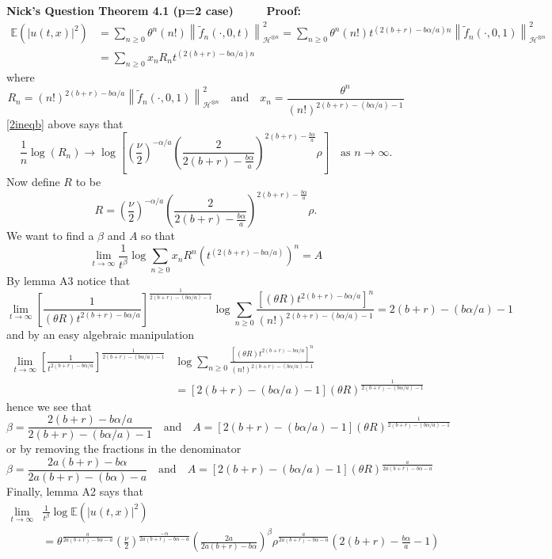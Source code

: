 \documentclass[a4paper,11pt]{article}
\numberwithin{equation}{section}
\theoremstyle{plain}
\theoremstyle{definition}
\newcommand{\Norm}[1]{\left\|  #1   \right\|}
\newcounter{NQ}
\newenvironment{NickQuestion}[1][] %
{\refstepcounter{NQ}
	\begin{mdframed}[backgroundcolor=lightgray]\textbf{Nick's Question \theNQ \: #1~~}~~~\noindent}%
	{\end{mdframed}}
\numberwithin{NQ}{section}
\numberwithin{LQ}{section}
\numberwithin{ZQ}{section}
\begin{document}
\begin{NickQuestion}[Theorem 4.1 (p=2 case)]
		\textbf{Proof:}
		\begin{align*}
		\mathbb{E}(|u(t,x)|^2)  &= \sum_{n\ge 0} \theta^n(n!)\Norm{\tilde{f}_n(\cdot,0,t)}_{\mathcal{H}^{\otimes n}}^2 = \sum_{n \ge 0}\theta^n(n!)t^{(2(b+r)-b\alpha/a)n}\Norm{\tilde{f}_n(\cdot,0,1)}_{\mathcal{H}^{\otimes n}}^2
		\\&= \sum_{n \ge 0}x_nR_nt^{(2(b+r)-b\alpha/a)n}
		\end{align*}
		where
		\[
		R_n = (n!)^{2(b+r)-b\alpha/a}\Norm{\tilde{f}_n(\cdot,0,1)}_{\mathcal{H}^{\otimes n}}^2 \quad \text{and} \quad x_n=\frac{\theta^n}{(n!)^{2(b+r)-(b\alpha/a)-1}}
		\]
		\ref{2ineqb} above says that
		\[
		\frac{1}{n}\log(R_n) \to  \log\left[\left( \frac{\nu}{2} \right)^{-\alpha/a}\left(\frac{2}{2(b+r)-\frac{b\alpha}{a}}\right)^{2(b+r)-\frac{b\alpha}{a}}  \rho \right]  \quad \text{as } n\to \infty.
		\]
		Now define $R$ to be
		\[
		R=\left( \frac{\nu}{2} \right)^{-\alpha/a}\left(\frac{2}{2(b+r)-\frac{b\alpha}{a}}\right)^{2(b+r)-\frac{b\alpha}{a}}  \rho.
		\]
		We want to find a $\beta$ and $A$ so that
		\[
		\lim_{t \to \infty}\frac{1}{t^\beta} \log \sum_{n \ge 0} x_nR^n\left(t^{(2(b+r)-b\alpha/a)}\right)^n = A
		\]
		By lemma A3 notice that
		\[
		\lim_{t\to \infty} \left[\frac{1}{(\theta R)t^{2(b+r)-b\alpha/a}}\right]^{\frac{1}{2(b+r)-(b\alpha/a)-1}} \log \sum_{n \ge 0} \frac{\left[ (\theta R) t^{2(b+r)-b\alpha/a}\right]^n}{(n!)^{2(b+r)-(b\alpha/a)-1}} = 2(b+r) - (b\alpha/a) -1
		\]
		and by an easy algebraic manipulation
		\begin{align*}
		\lim_{t\to \infty} \left[\frac{1}{t^{2(b+r)-b\alpha/a}}\right]^{\frac{1}{2(b+r)-(b\alpha/a)-1}} & \log \sum_{n \ge 0} \frac{\left[ (\theta R) t^{2(b+r)-b\alpha/a}\right]^n}{(n!)^{2(b+r)-(b\alpha/a)-1}}
		\\&= [2(b+r) - (b\alpha/a) -1](\theta R)^{\frac{1}{2(b+r)-(b\alpha/a)-1}}
		\end{align*}
		hence we see that
		\[
		\beta = \frac{2(b+r)-b\alpha/a}{2(b+r)-(b\alpha/a)-1} \quad \text{and} \quad A=[2(b+r) - (b\alpha/a) -1](\theta R)^{\frac{1}{2(b+r)-(b\alpha/a)-1}}
		\]
		or by removing the fractions in the denominator
		\[
		\beta = \frac{2a(b+r)-b\alpha}{2a(b+r)-(b\alpha)-a} \quad \text{and} \quad A=[2(b+r) - (b\alpha/a) -1](\theta R)^{\frac{a}{2a(b+r)-b\alpha-a}}
		\]
		Finally, lemma A2 says that
		\begin{align}
		\lim_{t\to \infty} & \frac{1}{t^\beta} \log \mathbb{E}(|u(t,x)|^2) \nonumber
		\\&= \theta^{\frac{a}{2a(b+r)-b\alpha-a}}\left(\frac{\nu}{2}\right)^{\frac{-\alpha}{2a(b+r)-b\alpha -a}}\left( \frac{2a}{2a(b+r)- b\alpha} \right)^\beta \rho^{\frac{a}{2a(b+r)-b\alpha-a}}\left(2(b+r)-\frac{b\alpha}{a}-1\right) \label{2pest}
		\end{align}


\end{NickQuestion}
\end{document}
